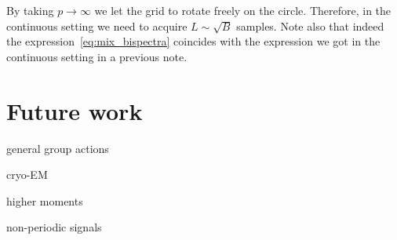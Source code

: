 \documentclass[english,12pt]{article}
\newcommand{\I}{\iota}
\newcommand{\tB}{B_w}
\numberwithin{equation}{section}
\begin{document}
By taking $p\to\infty$ we let the grid to rotate freely on the circle. Therefore, in the continuous setting we need to acquire $L\sim\sqrt{B}$ samples. Note also that indeed the expression~\eqref{eq:mix_bispectra} coincides with the expression we got in the continuous setting in a previous note.

\section{Future work}
general group actions

cryo-EM

higher moments

non-periodic signals 
%
\end{document}
